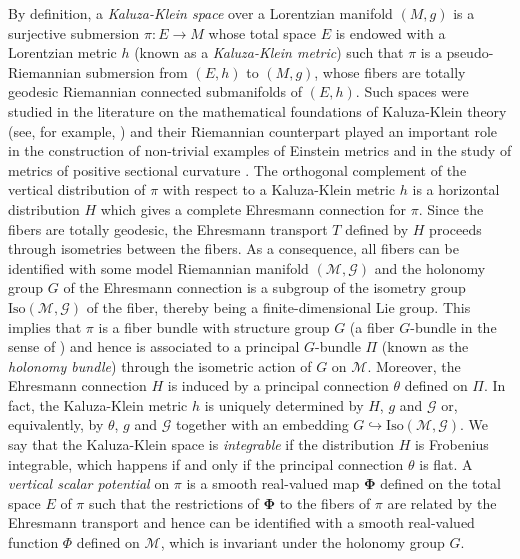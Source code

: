 \documentclass[10pt, cmp, numbook, final, a4paper]{svjour}
\newcommand{\cM}{\mathcal{M}}
\def\cG{\mathcal{G}}
\def\bPhi{\mathbf{\Phi}}
\def\Iso{\mathrm{Iso}}
\begin{document}
By definition, a {\em Kaluza-Klein space} over a Lorentzian
manifold $(M,g)$ is a surjective submersion $\pi:E\rightarrow M$ whose total
space $E$ is endowed with a Lorentzian metric $h$ (known as a {\em
  Kaluza-Klein metric}) such that $\pi$ is a pseudo-Riemannian
submersion \cite{ONeillBook} from $(E,h)$ to $(M,g)$, whose fibers are
totally geodesic Riemannian connected submanifolds of $(E,h)$. Such
spaces were studied in the literature on the mathematical foundations
of Kaluza-Klein theory (see, for example,
\cite{Bourguignon,Hogan,Betounes1,Betounes2}) and their Riemannian
counterpart played an important role in the construction of non-trivial
examples of Einstein metrics \cite{Besse} and in the study of metrics
of positive sectional curvature \cite{Ziller}. The orthogonal
complement of the vertical distribution of $\pi$ with respect to a
Kaluza-Klein metric $h$ is a horizontal distribution $H$ which gives a
complete Ehresmann connection for $\pi$. Since the fibers are totally
geodesic, the Ehresmann transport $T$ defined by $H$ proceeds through
isometries between the fibers. As a consequence, all fibers can be
identified with some model Riemannian manifold $(\cM,\cG)$ and the
holonomy group $G$ of the Ehresmann connection is a subgroup of the
isometry group $\Iso(\cM,\cG)$ of the fiber, thereby being a
finite-dimensional Lie group. This implies that $\pi$ is a fiber
bundle with structure group $G$ (a fiber $G$-bundle in the sense of
\cite{Kollar,Michor}) and hence is associated to a principal
$G$-bundle $\Pi$ (known as the {\em holonomy bundle}) through the
isometric action of $G$ on $\cM$. Moreover, the Ehresmann connection
$H$ is induced by a principal connection $\theta$ defined on $\Pi$. In
fact, the Kaluza-Klein metric $h$ is uniquely determined by $H$, $g$
and $\cG$ or, equivalently, by $\theta$, $g$ and $\cG$ together with
an embedding $G\hookrightarrow \Iso(\cM,\cG)$. We say that the
Kaluza-Klein space is {\em integrable} if the distribution $H$ is
Frobenius integrable, which happens if and only if the principal
connection $\theta$ is flat. A {\em vertical scalar potential} on
$\pi$ is a smooth real-valued map $\bPhi$ defined on the total space
$E$ of $\pi$ such that the restrictions of $\bPhi$ to the fibers of
$\pi$ are related by the Ehresmann transport and hence can be
identified with a smooth real-valued function $\Phi$ defined on $\cM$, 
which is invariant under the holonomy group $G$. 
\end{document}
